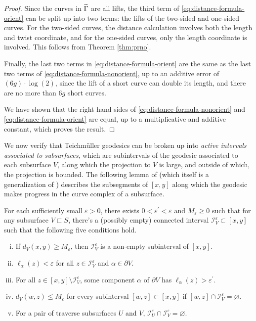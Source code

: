\documentclass[12pt, reqno]{amsart}
\begin{document}
\begin{proof}
Since the curves in $\widetilde{\Gamma}$ are all lifts, the third term of \eqref{eq:distance-formula-orient} can be split up into two terms: the lifts of the two-sided and one-sided curves.
For the two-sided curves, the distance calculation involves both the length and twist coordinate, and for the one-sided curves, only the length coordinate is involved.
This follows from Theorem \ref{thm:prno}.

Finally, the last two terms in \eqref{eq:distance-formula-orient} are the same as the last two terms of \eqref{eq:distance-formula-nonorient}, up to an additive error of $(6g) \cdot \log(2)$, since the lift of a short curve can double its length, and there are no more than $6g$ short curves.

We have shown that the right hand sides of \eqref{eq:distance-formula-nonorient} and \eqref{eq:distance-formula-orient} are equal, up to a multiplicative and additive constant, which proves the result.
\end{proof}

We now verify that Teichmüller geodesics can be broken up into \emph{active intervals associated to subsurfaces}, which are subintervals of the geodesic associated to each subsurface $V$, along which the projection to $V$ is large, and outside of which, the projection is bounded.
The following lemma  of \textcite[Lemma 3.26]{dowdall2023lattice} (which itself is a generalization of \textcite[Proposition 3.7]{rafi2007combinatorial}) describes the subsegments of $[x,y]$ along which the geodesic makes progress in the curve complex of a subsurface.

\begin{proposition}
  \label{thm:active-intervals}
  For each sufficiently small $\varepsilon > 0$, there exists $0 < \varepsilon^{\prime} < \varepsilon$ and $M_\varepsilon \geq 0$ such that for any subsurface $V \sqsubset S$, there's a (possibly empty) connected interval $\mathcal{I}_V^\varepsilon \subset [x,y]$ such that the following five conditions hold.
  \begin{enumerate}[(i)]
  \item If $d_V(x, y) \geq M_\varepsilon$, then $\mathcal{I}_V^{\varepsilon}$ is a non-empty subinterval of $[x,y]$.
  \item $\ell_\alpha(z) < \varepsilon$ for all $z \in \mathcal{I}_V^{\varepsilon}$ and $\alpha \in \partial V$.
  \item For all $z \in [x,y] \setminus \mathcal{I}_V^{\varepsilon}$, some component $\alpha$ of $\partial V$ has $\ell_\alpha(z) > \varepsilon^{\prime}$.
  \item $d_V(w, z) \leq M_\varepsilon$ for every subinterval $[w,z] \subset [x,y]$ if $[w,z] \cap \mathcal{I}_V^\varepsilon = \varnothing$.
  \item For a pair of traverse subsurfaces $U$ and $V$, $\mathcal{I}_U^\varepsilon \cap \mathcal{I}_V^\varepsilon = \varnothing$.
  \end{enumerate}
\end{proposition}
\end{document}
